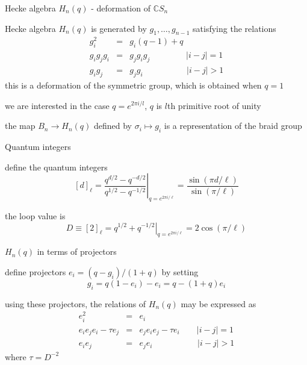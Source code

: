 \documentclass{prosper}
\renewcommand{\>}{\rangle}
\newcommand{\<}{\langle}
\begin{document}
\begin{slide}{Hecke algebra $H_n(q)$ - deformation of $\mathbb{C} S_n$} 

Hecke algebra $H_n(q)$ is generated by $g_1,\dotsc,g_{n-1}$
satisfying the relations
\begin{eqnarray*}
g_i^2 &=& g_i(q-1) + q \\
g_i g_{j} g_i &=&  g_{j}g_ig_{j} \quad\quad\quad\quad\; |i-j|=1 \\
g_ig_j  &=&  g_j g_i \quad\quad\quad\quad\quad\,  |i-j| > 1 
\end{eqnarray*}
this is a deformation of the symmetric group, which is
obtained when $q =1$

\medskip
we are interested in the case $q=e^{2\pi i/l}$, $q$ is $l$th primitive
root of unity 

\medskip
the map $B_n \rightarrow H_n(q)$ defined by $\sigma_i\mapsto g_i$ is a
representation of the braid group

\end{slide}

\begin{slide}{Quantum integers}

define the quantum integers
\[
{[d]}_\ell = \left.\frac{q^{d/2} - q^{-d/2}}{q^{1/2} - q^{-1/2}}
\right|_{q=e^{2\pi i/\ell}} = \frac{\sin(\pi d/\ell)}{\sin(\pi/\ell)}
\]

\bigskip
the loop value is
\[
D \equiv {[2]}_\ell = 
\left.q^{1/2} + q^{-1/2}\right|_{q=e^{2\pi i/\ell}} = 2\cos(\pi/\ell)
\]
\end{slide}

\begin{slide}{$H_n(q)$ in terms of projectors}

define projectors $e_i = (q-g_i)/(1+q)$ by setting
\[
g_i = q(1-e_i) - e_i = q - (1+q) e_i
\]

\bigskip
using these projectors, the relations of $H_n(q)$ may be expressed as
\begin{eqnarray*}
e_i^2 & = & e_i  \\
e_i e_j e_i - \tau e_j & = & e_{j}e_ie_{j} - \tau e_i \quad\quad |i-j| = 1\\
e_i e_j & = & e_j e_i \quad\quad\quad\quad\quad\,\, |i-j| > 1
\end{eqnarray*}
where $\tau=D^{-2}$
\end{slide}

\end{document}
